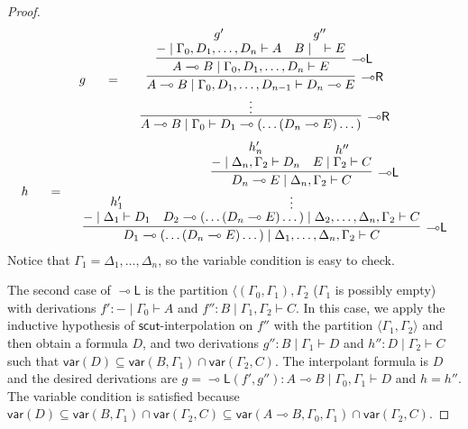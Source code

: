 \documentclass[sn-mathphys-num]{sn-jnl}%
\newcommand{\GG}{\Gamma}
\newcommand{\GD}{\Delta}
\newcommand{\vd}{\vdash}
\newcommand{\lolli}{\multimap}
\newcommand{\lleft}{{\lolli}\mathsf{L}}
\newcommand{\lright}{{\lolli}\mathsf{R}}
\newcommand{\vdG}{\vdash}
\newcommand{\mf}[1]{\mathsf{#1}}
\newcommand{\vars}[1]{\mathsf{var}(#1)}
\theoremstyle{thmstyleone}%
\theoremstyle{thmstyletwo}%
\theoremstyle{thmstylethree}%
\begin{document}
\begin{proof}
\begin{displaymath}
\begin{array}{c}
  \begin{array}{c}
    g
  \end{array}
  \quad 
  =
  \quad
    \begin{array}{c}
      \infer[\lright]{A\lolli B \mid \GG_0 \vdG D_1 \lolli (\dots (D_n \lolli E)\dots)}{
      \deduce{\vdots}{
        \infer[\lright]{A \lolli B \mid \GG_0 , D_1, \dots ,D_{n-1} \vdG D_n \lolli E}{
        \infer[\lleft]{A \lolli B \mid \GG_0 , D_1, \dots, D_n \vdG E}{
          \deduce{{-} \mid \GG_0 , D_1, \dots, D_n \vdG A}{g'}
          &
          \deduce{B \mid \quad \vdG E}{g''}
        }
      }
      }
    }
    \end{array}
  \end{array}
\end{displaymath}
\begin{displaymath}
    \begin{array}{c}
      h
    \end{array}
    \quad
    =
    \quad
    \begin{array}{c}
      \infer[\lleft]{D_1 \lolli (\dots (D_n \lolli E)\dots) \mid \GD_1, \dots, \GD_n, \GG_2 \vdG C}{
      \deduce{{-} \mid \GD_1 \vdG D_1}{h'_1}
      &
      \deduce{D_2 \lolli (\dots (D_n \lolli E)\dots) \mid \GD_2, \dots, \GD_n, \GG_2 \vdG C}{
        \deduce{\vdots}{
          \infer[\lleft]{D_n \lolli E \mid \GD_n, \GG_2 \vdG C}{
            \deduce{{-} \mid \GD_n, \GG_2 \vdG D_n}{h'_n}
            &
            \deduce{E \mid \GG_2 \vdG C}{h''}
          }
        }
      }
    }
    \end{array}
\end{displaymath}
Notice that $\GG_1 = \GD_1, \dots, \GD_n$, so the variable condition is easy to check.

The second case of $\lleft$ is the partition $\langle (\GG_0 , \GG_1) , \GG_2$ ($\GG_1$ is possibly empty) with derivations $f' : {-} \mid \GG_0 \vd A$ and $f'' : B \mid \GG_1 , \GG_2 \vd C$.
In this case, we apply the inductive hypothesis of $\mf{scut}$-interpolation on $f''$ with the partition $\langle \GG_1 , \GG_2 \rangle$ and then obtain a formula $D$, and two derivations $g'' : B \mid \GG_1 \vd D$ and $h'' : D \mid \GG_2 \vd C$ such that $\vars{D} \subseteq \vars{B , \GG_1} \cap \vars{\GG_2 , C}$.
The interpolant formula is $D$ and the desired derivations are $g = \lleft (f' , g'') : A \lolli B \mid \GG_0 , \GG_1 \vd D$ and $h = h''$.
The variable condition is satisfied because $\vars{D} \subseteq \vars{B , \GG_1} \cap \vars{\GG_2 , C} \subseteq \vars{A \lolli B , \GG_0 , \GG_1} \cap \vars{\GG_2 , C}$.


\end{proof}
\end{document}
